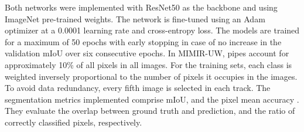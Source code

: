 Both networks were implemented with ResNet50 as the backbone and using ImageNet pre-trained weights. The network is fine-tuned using an Adam optimizer at a 0.0001 learning rate and cross-entropy loss. The models are trained for a maximum of 50 epochs with early stopping in case of no increase in the validation \ac{mIoU} over six consecutive epochs.
In MIMIR-UW, pipes account for approximately 10\% of all pixels in all images. For the training sets, each class is weighted inversely proportional to the number of pixels it occupies in the images. To avoid data redundancy, every fifth image is selected in each track.
The segmentation metrics implemented comprise \ac{mIoU}, and the pixel mean accuracy \cite{pascalvocchallenge}. They evaluate the overlap between ground truth and prediction, and the ratio of correctly classified pixels, respectively.






